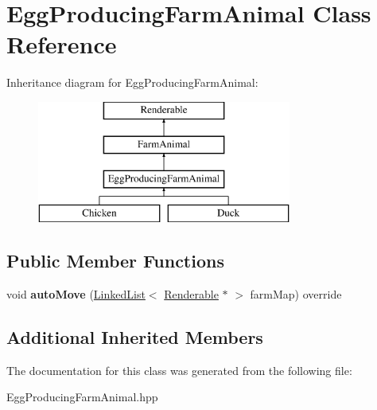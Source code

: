\hypertarget{class_egg_producing_farm_animal}{}\section{Egg\+Producing\+Farm\+Animal Class Reference}
\label{class_egg_producing_farm_animal}
Inheritance diagram for Egg\+Producing\+Farm\+Animal\+:\begin{figure}[H]
\begin{center}
\leavevmode
\includegraphics[height=4.000000cm]{class_egg_producing_farm_animal}
\end{center}
\end{figure}
\subsection*{Public Member Functions}
\begin{DoxyCompactItemize}
\item 
\mbox{\label{class_egg_producing_farm_animal_a05b041ddeee96d12695a0d8445c69fa1}} 
void {\bfseries auto\+Move} (\mbox{\hyperlink{class_linked_list}{Linked\+List}}$<$ \mbox{\hyperlink{class_renderable}{Renderable}} $\ast$ $>$ farm\+Map) override
\end{DoxyCompactItemize}
\subsection*{Additional Inherited Members}


The documentation for this class was generated from the following file\+:\begin{DoxyCompactItemize}
\item 
Egg\+Producing\+Farm\+Animal.\+hpp\end{DoxyCompactItemize}
